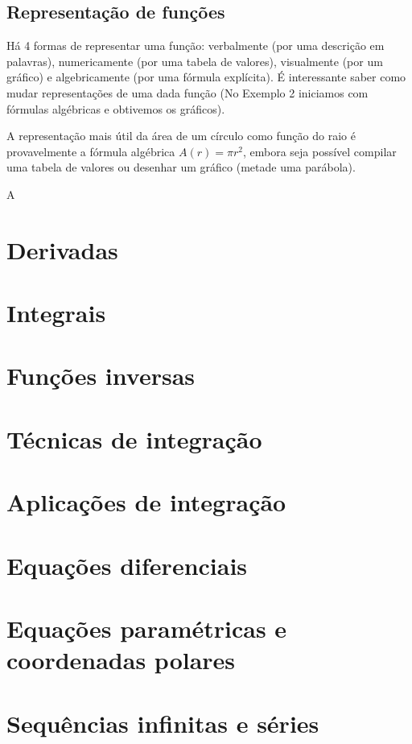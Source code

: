 \subsection{Representação de funções}
Há 4 formas de representar uma função: verbalmente (por uma descrição em palavras), numericamente (por uma tabela de valores), visualmente (por um gráfico) e algebricamente (por uma fórmula explícita). É interessante saber como mudar representações de uma dada função (No Exemplo 2 iniciamos com fórmulas algébricas e obtivemos os gráficos).

A representação mais útil da área de um círculo como função do raio é provavelmente a fórmula algébrica $A(r)=\pi r^2$, embora seja possível compilar uma tabela de valores ou desenhar um gráfico (metade uma parábola).

A

\section{Derivadas}
\section{Integrais}
\section{Funções inversas}
\section{Técnicas de integração}
\section{Aplicações de integração}
\section{Equações diferenciais}
\section{Equações paramétricas e coordenadas polares}
\section{Sequências infinitas e séries}

